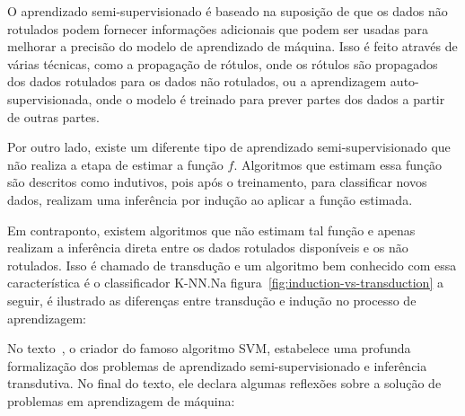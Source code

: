 O aprendizado semi-supervisionado é baseado na suposição de que os
dados não rotulados podem fornecer informações adicionais que podem
ser usadas para melhorar a precisão do modelo de aprendizado de
máquina. Isso é feito através de várias técnicas, como a propagação de
rótulos, onde os rótulos são propagados dos dados rotulados para os
dados não rotulados, ou a aprendizagem auto-supervisionada, onde o
modelo é treinado para prever partes dos dados a partir de outras
partes.

Por outro lado, existe um diferente tipo de aprendizado
semi-supervisionado que não realiza a etapa de estimar a função $ f
$. Algoritmos que estimam essa função são descritos como indutivos,
pois após o treinamento, para classificar novos dados, realizam uma
inferência por indução ao aplicar a função estimada.

Em contraponto, existem algoritmos que não estimam tal função e apenas
realizam a inferência direta entre os dados rotulados disponíveis e os
não rotulados. Isso é chamado de transdução e um algoritmo bem
conhecido com essa característica é o classificador K-NN.\@ Na
figura~\ref{fig:induction-vs-transduction} a seguir, é ilustrado as
diferenças entre transdução e indução no processo de aprendizagem:


\begin{figure}[h!]
        \captionsetup{width=12cm}
		\centering
\end{figure}


No texto~\cite{vapnik2006semi}, o criador do famoso algoritmo SVM,
estabelece uma profunda formalização dos problemas de aprendizado
semi-supervisionado e inferência transdutiva. No final do texto, ele declara
algumas reflexões sobre a solução de problemas em aprendizagem de máquina:


